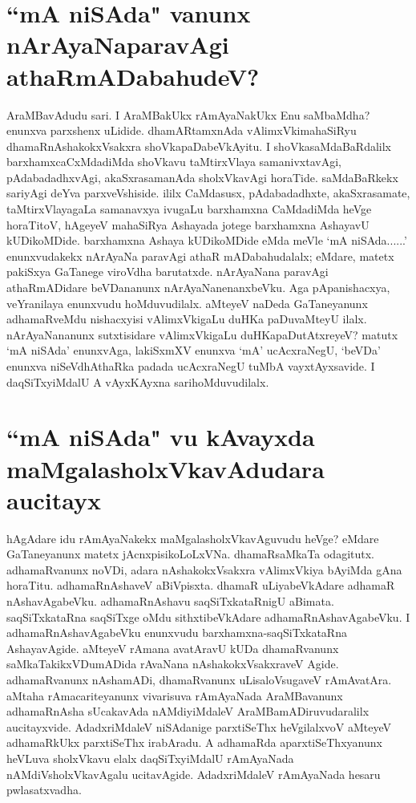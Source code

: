 \section*{``mA niSAda" vanunx nArAyaNaparavAgi athaRmADabahudeV?} 

AraMBavAdudu sari. I AraMBakUkx rAmAyaNakUkx Enu saMbaMdha? enunxva parxshenx uLidide. dhamARtamxnAda vAlimxVkimahaSiRyu dhamaRnAshakokxVsakxra shoVkapaDabeVkAyitu. I shoVkasaMdaBaRdalilx barxhamxcaCxMdadiMda shoVkavu taMtirxVlaya samanivxtavAgi, pAdabadadhxvAgi, akaSxrasamanAda sholxVkavAgi horaTide. saMdaBaRkekx sariyAgi deYva parxveVshiside. ililx CaMdasusx, pAdabadadhxte, akaSxrasamate, taMtirxVlayagaLa samanavxya ivugaLu barxhamxna CaMdadiMda heVge horaTitoV, hAgeyeV mahaSiRya Ashayada jotege barxhamxna AshayavU kUDikoMDide. barxhamxna Ashaya kUDikoMDide eMda meVle `mA niSAda......' enunxvudakekx nArAyaNa paravAgi athaR mADabahudalalx; eMdare, matetx pakiSxya GaTanege viroVdha barutatxde. nArAyaNana paravAgi athaRmADidare beVDananunx nArAyaNanenanxbeVku. Aga pApanishacxya, veYranilaya enunxvudu hoMduvudilalx. aMteyeV naDeda GaTaneyanunx adhamaRveMdu nishacxyisi vAlimxVkigaLu duHKa paDuvaMteyU ilalx. nArAyaNananunx sutxtisidare vAlimxVkigaLu duHKapaDutAtxreyeV? matutx `mA niSAda' enunxvAga, lakiSxmXV enunxva `mA' ucAcxraNegU, `beVDa' enunxva niSeVdhAthaRka padada ucAcxraNegU tuMbA vayxtAyxsavide. I daqSiTxyiMdalU A vAyxKAyxna sarihoMduvudilalx. 

\section*{``mA niSAda" vu kAvayxda maMgalasholxVkavAdudara aucitayx} 

hAgAdare idu rAmAyaNakekx maMgalasholxVkavAguvudu heVge? eMdare GaTaneyanunx matetx jAcnxpisikoLoLxVNa. dhamaRsaMkaTa odagitutx. adhamaRvanunx noVDi, adara nAshakokxVsakxra vAlimxVkiya bAyiMda gAna horaTitu. adhamaRnAshaveV aBiVpisxta. dhamaR uLiyabeVkAdare adhamaR nAshavAgabeVku. adhamaRnAshavu saqSiTxkataRnigU aBimata. saqSiTxkataRna saqSiTxge oMdu sithxtibeVkAdare adhamaRnAshavAgabeVku. I adhamaRnAshavAgabeVku enunxvudu barxhamxna-saqSiTxkataRna AshayavAgide. aMteyeV rAmana avatAravU kUDa dhamaRvanunx saMkaTakikxVDumADida rAvaNana nAshakokxVsakxraveV Agide. adhamaRvanunx nAshamADi, dhamaRvanunx uLisaloVsugaveV rAmAvatAra. aMtaha rAmacariteyanunx vivarisuva rAmAyaNada AraMBavanunx adhamaRnAsha sUcakavAda nAMdiyiMdaleV AraMBamADiruvudaralilx aucitayxvide. AdadxriMdaleV niSAdanige parxtiSeThx heVgilalxvoV aMteyeV adhamaRkUkx parxtiSeThx irabAradu. A adhamaRda aparxtiSeThxyanunx heVLuva sholxVkavu elalx daqSiTxyiMdalU rAmAyaNada nAMdiVsholxVkavAgalu ucitavAgide. AdadxriMdaleV rAmAyaNada hesaru pwlasatxvadha. 

